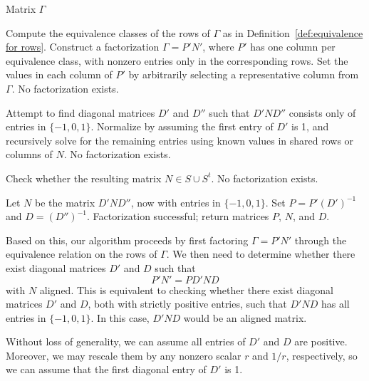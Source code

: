 \documentclass{article}
\begin{document}
\begin{algorithm}
\caption{Algorithm to check whether a matrix \( \Gamma \) can be factored as \( PND \)}\label{alg:algopnd}
\begin{algorithmic} 
\Require Matrix \( \Gamma \)

\State Compute the equivalence classes of the rows of \( \Gamma \) as in Definition~\ref{def:equivalence for rows}.
\State Construct a factorization \( \Gamma = P'N' \), where \( P' \) has one column per equivalence class, with nonzero entries only in the corresponding rows. Set the values in each column of \( P' \) by arbitrarily selecting a representative column from \( \Gamma \).
    \State \Return No factorization exists.
\EndIf

\State Attempt to find diagonal matrices \( D' \) and \( D'' \) such that \( D'N D'' \) consists only of entries in \( \{ -1, 0, 1 \} \).
\State Normalize by assuming the first entry of \( D' \) is 1, and recursively solve for the remaining entries using known values in shared rows or columns of \( N \).
    \State \Return No factorization exists.
\EndIf

\State Check whether the resulting matrix \( N \in S \cup S^t \).
    \State \Return No factorization exists.
\EndIf

\State Let \( N \) be the matrix \( D'ND'' \), now with entries in \( \{ -1, 0, 1 \} \).
\State Set \( P = P'(D')^{-1} \) and \( D = (D'')^{-1} \).
\State \Return Factorization successful; return matrices \( P \), \( N \), and \( D \).
\end{algorithmic}
\end{algorithm}


Based on this, our algorithm proceeds by first factoring \( \Gamma = P'N' \) through the equivalence relation on the rows of \( \Gamma \). We then need to determine whether there exist diagonal matrices \( D' \) and \( D \) such that
\[
P'N' = P D' N D
\]
with \( N \) aligned. This is equivalent to checking whether there exist diagonal matrices \( D' \) and \( D \), both with strictly positive entries, such that \( D'ND \) has all entries in \( \{ -1, 0, 1 \} \). In this case, \( D'ND \) would be an aligned matrix.

Without loss of generality, we can assume all entries of \( D' \) and \( D \) are positive. Moreover, we may rescale them by any nonzero scalar \( r \) and \( 1/r \), respectively, so we can assume that the first diagonal entry of \( D' \) is 1.
\end{document}
